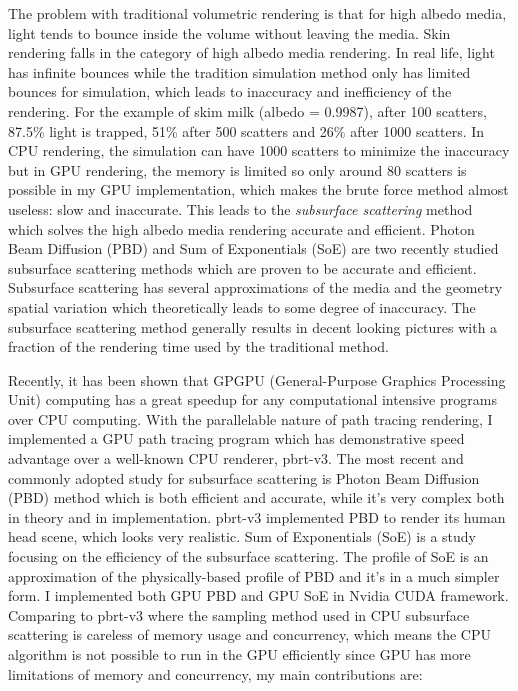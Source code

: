 \documentclass[letterpaper,12pt]{article}
\begin{document}
The problem with traditional volumetric rendering is that for high albedo media, light tends to bounce inside the volume without leaving the media. Skin rendering falls in the category of high albedo media rendering. In real life, light has infinite bounces while the tradition simulation method only has limited bounces for simulation, which leads to inaccuracy and inefficiency of the rendering. For the example of skim milk (albedo = 0.9987), after 100 scatters, 87.5\% light is trapped, 51\% after 500 scatters and 26\% after 1000 scatters\cite{pharr2016physically}. In CPU rendering, the simulation can have 1000 scatters to minimize the inaccuracy but in GPU rendering, the memory is limited so only around 80 scatters is possible in my GPU implementation, which makes the brute force method almost useless: slow and inaccurate. This leads to the \textit{subsurface scattering} method which solves the high albedo media rendering accurate and efficient. Photon Beam Diffusion (PBD) and Sum of Exponentials (SoE) are two recently studied subsurface scattering methods which are proven to be accurate and efficient. Subsurface scattering has several approximations of the media and the geometry spatial variation which theoretically leads to some degree of inaccuracy. The subsurface scattering method generally results in decent looking pictures with a fraction of the rendering time used by the traditional method.

Recently, it has been shown that GPGPU (General-Purpose Graphics Processing Unit) computing has a great speedup for any computational intensive programs over CPU computing\cite{luebke2006gpgpu}. With the parallelable nature of path tracing rendering, I implemented a GPU path tracing program which has demonstrative speed advantage over a well-known CPU renderer, pbrt-v3. The most recent and commonly adopted study for subsurface scattering is Photon Beam Diffusion (PBD) method which is both efficient and accurate, while it's very complex both in theory and in implementation. pbrt-v3 implemented PBD to render its human head scene, which looks very realistic. Sum of Exponentials (SoE) is a study focusing on the efficiency of the subsurface scattering. The profile of SoE is an approximation of the physically-based profile of PBD and it's in a much simpler form. I implemented both GPU PBD and GPU SoE in Nvidia CUDA framework. Comparing to pbrt-v3 where the sampling method used in CPU subsurface scattering is careless of memory usage and concurrency, which means the CPU algorithm is not possible to run in the GPU efficiently since GPU has more limitations of memory and concurrency, my main contributions are:
\end{document}
